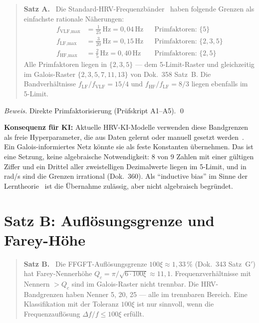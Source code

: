 \begin{quote}
\textbf{Satz A.} \BM\ Die Standard-HRV-Frequenzbänder \LM\,\cite{TaskForce1996}
haben folgende Grenzen als einfachste rationale Näherungen:
\begin{align}
f_\text{VLF,max} &= \tfrac{1}{25}\,\text{Hz} = 0{,}04\,\text{Hz}
  && \text{Primfaktoren: } \{5\} \\
f_\text{LF,max}  &= \tfrac{3}{20}\,\text{Hz} = 0{,}15\,\text{Hz}
  && \text{Primfaktoren: } \{2,3,5\} \\
f_\text{HF,max}  &= \tfrac{2}{5}\,\text{Hz} = 0{,}40\,\text{Hz}
  && \text{Primfaktoren: } \{2,5\}
\end{align}
Alle Primfaktoren liegen in $\{2,3,5\}$ --- dem 5-Limit-Raster und
gleichzeitig im Galois-Raster $\{2,3,5,7,11,13\}$ von Dok.~358 Satz~B.
Die Bandverhältnisse $f_\text{LF}/f_\text{VLF} = 15/4$ und
$f_\text{HF}/f_\text{LF} = 8/3$ liegen ebenfalls im 5-Limit.
\end{quote}

\emph{Beweis.} Direkte Primfaktorisierung (Prüfskript A1--A5). \qed

\textbf{Konsequenz für KI:} Aktuelle HRV-KI-Modelle verwenden diese
Bandgrenzen als freie Hyperparameter, die aus Daten gelernt oder manuell
gesetzt werden \LM\,\cite{Villanueva2026}. Ein Galois-informiertes Netz
könnte sie als feste Konstanten übernehmen. Das ist eine Setzung, keine
algebraische Notwendigkeit: 8 von 9 Zahlen mit einer gültigen Ziffer und
ein Drittel aller zweistelligen Dezimalwerte liegen im 5-Limit, und in
rad/s sind die Grenzen irrational (Dok.~360). Als ``inductive bias'' im
Sinne der Lerntheorie \LM\,\cite{ILCRBlog2023} ist die Übernahme
zulässig, aber nicht algebraisch begründet.

\section{Satz B: Auflösungsgrenze und Farey-Höhe}

\begin{quote}
\textbf{Satz B.} \BM\ Die FFGFT-Auflösungsgrenze $100\xi\approx1{,}33\,\%$
(Dok.~343 Satz~G$'$) hat Farey-Nennerhöhe
$Q_c = \pi/\sqrt{6\cdot100\xi} \approx 11{,}1$.
Frequenzverhältnisse mit Nennern $>Q_c$ sind im Galois-Raster nicht
trennbar. Die HRV-Bandgrenzen haben Nenner 5, 20, 25 --- alle im
trennbaren Bereich. Eine Klassifikation mit der Toleranz $100\xi$ ist
nur sinnvoll, wenn die Frequenzauflösung $\Delta f/f\le100\xi$ erfüllt.
\end{quote}

